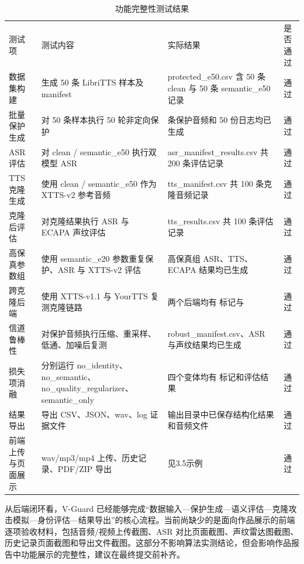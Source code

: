 {\def\LTcaptype{table} %
\begin{longtable}[]{@{}
  >{\centering\arraybackslash}m{}
  >{\centering\arraybackslash}m{}
  >{\centering\arraybackslash}m{}
  >{\centering\arraybackslash}m{}@{}}
\caption{功能完整性测试结果}\\
\toprule\noalign{}
\endhead
\bottomrule\noalign{}
\endlastfoot
测试项 & 测试内容 & 实际结果 & 是否通过 \\
数据集构建 & 生成 50 条 LibriTTS 样本及 manifest & protected\_e50.csv 含
50 条 clean 与 50 条 semantic\_e50 记录 & 通过 \\
批量保护生成 & 对 50 条样本执行 50 轮非定向保护 & 50 条保护音频和 50
份日志均已生成 & 通过 \\
ASR 评估 & 对 clean / semantic\_e50 执行双模型 ASR &
asr\_manifest\_results.csv 共 200 条评估记录 & 通过 \\
TTS 克隆生成 & 使用 clean / semantic\_e50 作为 XTTS-v2 参考音频 &
tts\_manifest.csv 共 100 条克隆音频记录 & 通过 \\
克隆后评估 & 对克隆结果执行 ASR 与 ECAPA 声纹评估 & tts\_results.csv 共
100 条评估记录 & 通过 \\
高保真参数组 & 使用 semantic\_e20 参数重复保护、ASR 与 XTTS-v2 评估 &
高保真组 ASR、TTS、ECAPA 结果均已生成 & 通过 \\
跨克隆后端 & 使用 XTTS-v1.1 与 YourTTS 复测克隆链路 & 两个后端均有
标记与 & 通过 \\
信道鲁棒性 & 对保护音频执行压缩、重采样、低通、加噪后复测 &
robust\_manifest.csv、ASR 与声纹结果均已生成 & 通过 \\
损失项消融 & 分别运行
no\_identity、no\_semantic、no\_quality\_regularizer、semantic\_only &
四个变体均有 标记和评估结果 & 通过 \\
结果导出 & 导出 CSV、JSON、wav、log 证据文件 &
输出目录中已保存结构化结果和音频文件 & 通过 \\
前端上传与页面展示 & wav/mp3/mp4 上传、历史记录、PDF/ZIP 导出 &
见3.5示例 & 通过 \\
\end{longtable}
}

从后端闭环看，V-Guard
已经能够完成``数据输入---保护生成---语义评估---克隆攻击模拟---身份评估---结果导出''的核心流程。当前尚缺少的是面向作品展示的前端逐项验收材料，包括音频/视频上传截图、ASR
对比页面截图、声纹雷达图截图、历史记录页面截图和导出文件截图。这部分不影响算法实测结论，但会影响作品报告中功能展示的完整性，建议在最终提交前补齐。


